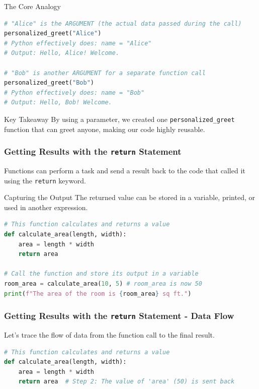 \documentclass{beamer}
\begin{document}
\begin{frame}[fragile]
\begin{block}{The Core Analogy}
\begin{frame}[fragile]
\begin{lstlisting}[language=Python]
# "Alice" is the ARGUMENT (the actual data passed during the call)
personalized_greet("Alice")
# Python effectively does: name = "Alice"
# Output: Hello, Alice! Welcome.

# "Bob" is another ARGUMENT for a separate function call
personalized_greet("Bob")
# Python effectively does: name = "Bob"
# Output: Hello, Bob! Welcome.
    \end{lstlisting}
    
    \begin{block}{Key Takeaway}
        By using a parameter, we created one \texttt{personalized\_greet} function that can greet anyone, making our code highly reusable.
    \end{block}
    
\end{frame}

\begin{frame}[fragile]
    \frametitle{Getting Results with the \texttt{return} Statement}
    
    Functions can perform a task and send a result back to the code that called it using the \texttt{return} keyword.
    
    \begin{block}{Capturing the Output}
        The returned value can be stored in a variable, printed, or used in another expression.
    \end{block}
    
    \begin{lstlisting}[language=Python]
# This function calculates and returns a value
def calculate_area(length, width):
    area = length * width
    return area

# Call the function and store its output in a variable
room_area = calculate_area(10, 5) # room_area is now 50
print(f"The area of the room is {room_area} sq ft.")
    \end{lstlisting}
    
\end{frame}

\begin{frame}[fragile]
    \frametitle{Getting Results with the \texttt{return} Statement - Data Flow}
    
    Let's trace the flow of data from the function call to the final result.
    
    \begin{lstlisting}[language=Python]
# This function calculates and returns a value
def calculate_area(length, width):
    area = length * width
    return area  # Step 2: The value of 'area' (50) is sent back


\end{lstlisting}
\end{frame}
\end{block}
\end{frame}
\end{document}
